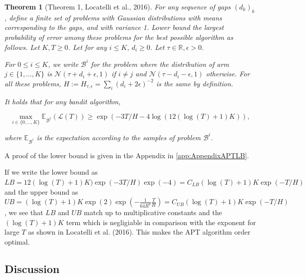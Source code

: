 \documentclass[11pt,]{article}
\newtheorem{theorem}{Theorem}
\begin{document}
\begin{theorem}[Theorem 1, Locatelli et al., 2016] 
\label{theorem:Locatelli2016Theorem1}
For any sequence of gaps $(d_k)_k$, define a finite set of problems with Gaussian distributions with means corresponding to the gaps, and with variance 1. Lower bound the largest probability of error among these problems for the best possible algorithm as follows. Let $K,T \geq 0$. Let for any $i \leq K$, $d_i \geq 0$. Let $\tau \in \mathbb{R}, \epsilon > 0$.

For $0 \leq i \leq K$, we write $\mathcal{B}^i$ for the problem where the distribution of arm $j \in \{1, \dots, K\}$ is $\mathcal{N}(\tau+d_i+\epsilon, 1)$ if $i \neq j$ and $\mathcal{N}(\tau-d_i-\epsilon, 1)$ otherwise. For all these problems, $H := H_{\tau, \epsilon} = \sum_i (d_i+2\epsilon)^{-2}$ is the same by definition.

It holds that for any bandit algorithm,

\begin{equation*}
\max_{i \in \{0, \dots, K\}} \mathbb{E}_{\mathcal{B}^i} (\mathcal{L}(T)) \geq \exp(-3T/H-4 \log(12(\log(T)+1)K)),
\end{equation*}

where $\mathbb{E}_{\mathcal{B}^i}$ is the expectation according to the samples of problem $\mathcal{B}^i$.
\end{theorem}

A proof of the lower bound is given in the Appendix in
\autoref{app:AppendixAPTLB}.

If we write the lower bound as
\(LB = 12(\log(T)+1)K)\exp(-3T/H)\exp(-4) = C_{LB}(\log(T)+1)K\exp(-T/H)\)
and the upper bound as
\(UB = (\log(T)+1)K \exp(2) \exp(-\frac{1}{64R^2}\frac{T}{H}) = C_{UB}(\log(T)+1)K\exp(-T/H)\),
we see that \(LB\) and \(UB\) match up to multiplicative constants and
the \((\log(T)+1)K\) term which is negligiable in comparison with the
exponent for large \(T\) as shown in Locatelli et al. (2016). This makes
the APT algorithm order optimal.

\subsection{\texorpdfstring{Discussion
\label{sec:DiscussionLocatelli}}{Discussion }}\label{discussion}
\end{document}
